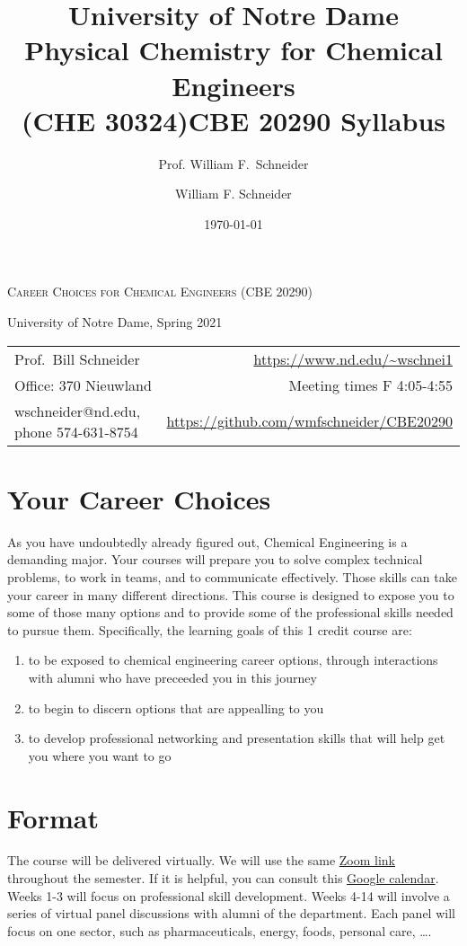 \documentclass[11pt]{article}
\title{University of Notre Dame\\Physical Chemistry for Chemical Engineers\\(CHE 30324)}
\author{Prof. William F.\ Schneider}
\author{William F. Schneider}
\date{\today}
\title{CBE 20290  Syllabus}
\begin{document}
\begin{OPTIONS}
\end{OPTIONS}

\begin{center}
\textsc{Career Choices for Chemical Engineers (CBE 20290)}

University of Notre Dame, Spring 2021
\end{center}

\begin{center}
\begin{tabular}{lr}
\hline
Prof.~Bill Schneider & \url{https://www.nd.edu/\~wschnei1}\\
Office: 370 Nieuwland & Meeting times F 4:05-4:55\\
wschneider@nd.edu, phone 574-631-8754 & \url{https://github.com/wmfschneider/CBE20290}\\
\hline
\end{tabular}
\end{center}

\section{Your Career Choices}
\label{sec:org0f2c4e3}
As you have undoubtedly already figured out, Chemical Engineering is a demanding major. Your courses will prepare you to solve complex technical problems, to work in teams, and to communicate effectively.  Those skills can take your career in many different directions. This course is designed to expose you to some of those many options and to provide some of the professional skills needed to pursue them. Specifically, the learning goals of this 1 credit course are:

\begin{enumerate}
\item to be exposed to chemical engineering career options, through interactions with alumni who have preceeded you in this journey
\item to begin to discern options that are appealling to you
\item to develop  professional networking and presentation skills that will help get you where you want to go
\end{enumerate}

\section{Format}
\label{sec:orgb5f65ab}
The course will be delivered virtually. We will use the same \href{https://notredame.zoom.us/j/91572218330?pwd=WFFvRW9DU3UvMHhXUTBwQUNIZzd0dz09}{Zoom link} throughout the semester. If it is helpful, you can consult this \href{https://calendar.google.com/calendar/u/0?cid=Y183NG02cDJnYWQ2NDQ4OTUzZGthaHJia2Nnc0Bncm91cC5jYWxlbmRhci5nb29nbGUuY29t}{Google calendar}.  Weeks 1-3 will focus on professional skill development. Weeks 4-14 will involve a series of virtual panel discussions with alumni of the department. Each panel will focus on one sector, such as pharmaceuticals, energy, foods, personal care, \ldots.
\end{document}
